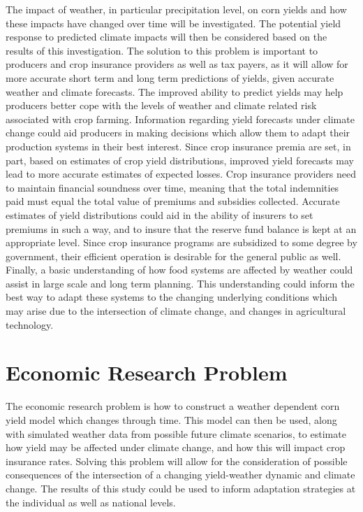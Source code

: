 The impact of weather, in particular precipitation level, on corn yields and how these impacts have changed over time will be investigated. The potential yield response to predicted climate impacts will then be considered based on the results of this investigation. The solution to this problem is important to producers and crop insurance providers as well as tax payers, as it will allow for more accurate short term and long term predictions of yields, given accurate weather and climate forecasts. The improved ability to predict yields may help producers better cope with the levels of weather and climate related risk associated with crop farming. Information regarding yield forecasts under climate change could aid producers in making decisions which allow them to adapt their production systems in their best interest. Since crop insurance premia are set, in part, based on estimates of crop yield distributions, improved yield forecasts may lead to more accurate estimates of expected losses. Crop insurance providers need to maintain financial soundness over time, meaning that the total indemnities paid must equal the total value of premiums and subsidies collected. Accurate estimates of  yield distributions could aid in the ability of insurers to set premiums in such a way, and to insure that the reserve fund balance is kept at an appropriate level. Since crop insurance programs are subsidized to some degree by government, their efficient operation is desirable for the general public as well. Finally, a basic understanding of how food systems are affected by weather could assist in large scale and long term planning. This understanding could inform the best way to adapt these systems to the changing underlying conditions which may arise due to the intersection of climate change, and changes in agricultural technology.

\section{Economic Research Problem}

The economic research problem is how to construct a weather dependent corn yield model which changes through time. This model can then be used, along with simulated weather data from possible future climate scenarios, to estimate how yield may be affected under climate change, and how this will impact crop insurance rates. Solving this problem will allow for the consideration of possible consequences of the intersection of a changing yield-weather dynamic and climate change. The results of this study could be used to inform adaptation strategies at the individual as well as national levels. 

